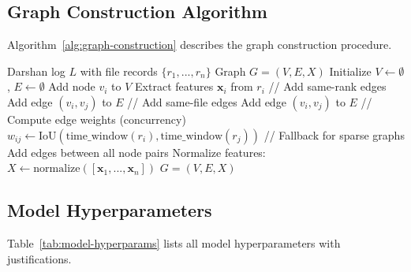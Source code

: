 \subsection{Graph Construction Algorithm}

Algorithm~\ref{alg:graph-construction} describes the graph construction procedure.

\begin{algorithm}[ht]
\caption{Graph Construction from Darshan Log}
\label{alg:graph-construction}
\begin{algorithmic}[1]
\REQUIRE Darshan log $L$ with file records $\{r_1, ..., r_n\}$
\ENSURE Graph $G = (V, E, X)$
\STATE Initialize $V \leftarrow \emptyset$, $E \leftarrow \emptyset$
    \STATE Add node $v_i$ to $V$
    \STATE Extract features $\mathbf{x}_i$ from $r_i$
\ENDFOR
\STATE // Add same-rank edges
        \STATE Add edge $(v_i, v_j)$ to $E$
    \ENDIF
\ENDFOR
\STATE // Add same-file edges
        \STATE Add edge $(v_i, v_j)$ to $E$
    \ENDIF
\ENDFOR
\STATE // Compute edge weights (concurrency)
    \STATE $w_{ij} \leftarrow \text{IoU}(\text{time\_window}(r_i), \text{time\_window}(r_j))$
\ENDFOR
\STATE // Fallback for sparse graphs
    \STATE Add edges between all node pairs
\ENDIF
\STATE Normalize features: $X \leftarrow \text{normalize}([\mathbf{x}_1, ..., \mathbf{x}_n])$
\RETURN $G = (V, E, X)$
\end{algorithmic}
\end{algorithm}

\subsection{Model Hyperparameters}

Table~\ref{tab:model-hyperparams} lists all model hyperparameters with justifications.

